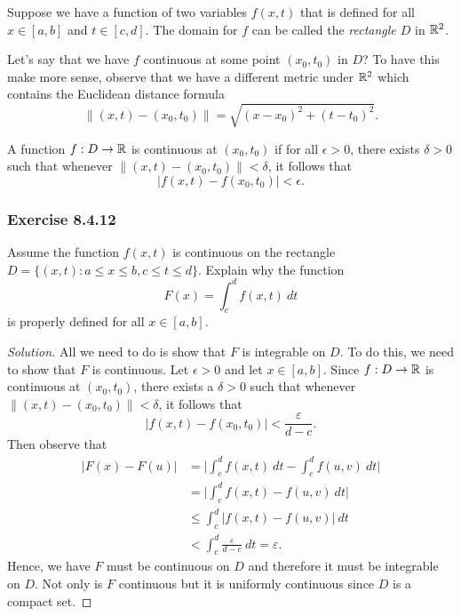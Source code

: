 Suppose we have a function of two variables \( f(x,t)  \) that is defined for all \(  x \in [a,b]  \) and \( t \in [c, d]  \). The domain for  \( f  \) can be called the \textit{rectangle \( D  \)} in \( \mathbb{R}^{2} \). 

Let's say that we have \( f  \) continuous at some point \( (x_{0}, t_{0}) \) in \(  D  \)? To have this make more sense, observe that we have a different metric under \( \mathbb{R}^{2} \) which contains the Euclidean distance formula 
\[  \lVert (x,t) - (x_{0}, t_{0}) \rVert = \sqrt{ (x - x_{0})^{2} + (t - t_{0})^{2}  }. \]

\begin{definition}
   A function \( f: D \to \mathbb{R}   \)  is continuous at \( (x_{0}, t_{0})  \) if for all \( \epsilon > 0  \), there exists \( \delta > 0  \) such that whenever \( \lVert (x,t) - (x_{0}, t_{0})  \rVert < \delta  \), it follows that 
   \[  | f(x,t) - f(x_{0}, t_{0})  | < \epsilon. \]
\end{definition}

\subsubsection{Exercise 8.4.12} Assume the function \( f(x,t)  \) is continuous on the rectangle \( D = \{ (x,t) : a \leq x \leq b , c \leq t \leq d  \}. \) Explain why the function
\[  F(x) = \int_{ c }^{ d } f(x,t) \ dt \] is properly defined for all \( x \in [a,b]  \).
\begin{proof}[Solution]
    All we need to do is show that \( F \) is integrable on \( D  \). To do this, we need to show that \( F  \) is continuous. Let \( \epsilon > 0  \) and let \( x \in [a,b] \). Since \( f: D \to \mathbb{R}   \) is continuous at \( (x_{0}, t_{0}) \), there exists a \( \delta > 0 \) such that whenever \( \lVert (x,t) - (x_{0}, t_{0}) \rVert <  \delta  \), it follows that 
\[ | f(x,t) - f(x_{0}, t_{0}) | < \frac{ \varepsilon }{  d - c  } .  \] 
Then observe that 
\begin{align*}
    | F(x) - F(u)  | &= \Big| \int_{ c }^{ d } f(x,t) \ dt - \int_{ c }^{ d } f(u,v) \  dt \Big|   \\
                     &= \Big| \int_{ c }^{ d } f(x,t) - f(u,v) \ dt \Big| \\
                     &\leq \int_{ c }^{ d }  | f(x,t) - f(u,v) | \  dt \\
                     &< \int_{ c }^{ d }  \frac{ \varepsilon }{ d -c  } \  dt 
                     = \varepsilon.
\end{align*}
Hence, we have \( F  \) must be continuous on \( D  \) and therefore it must be integrable on \( D  \). Not only is \( F  \) continuous but it is uniformly continuous since \( D  \) is a compact set.
\end{proof}

